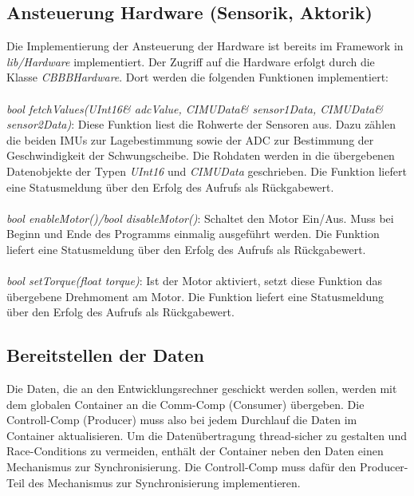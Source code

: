         \subsection{Ansteuerung Hardware (Sensorik, Aktorik)}
            Die Implementierung der Ansteuerung der Hardware ist bereits im Framework in \textit{lib/Hardware} implementiert. Der Zugriff auf die Hardware erfolgt durch die Klasse \textit{CBBBHardware}. Dort werden die folgenden Funktionen implementiert:\\
            \\
            \textit{bool fetchValues(UInt16\& adcValue, CIMUData\& sensor1Data, CIMUData\& sensor2Data)}: Diese Funktion liest die Rohwerte der Sensoren aus. Dazu zählen die beiden IMUs zur Lagebestimmung sowie der ADC zur Bestimmung der Geschwindigkeit der Schwungscheibe. Die Rohdaten werden in die übergebenen Datenobjekte der Typen \textit{UInt16} und \textit{CIMUData} geschrieben. Die Funktion liefert eine Statusmeldung über den Erfolg des Aufrufs als Rückgabewert.\\
            \\
            \textit{bool enableMotor()/bool disableMotor()}: Schaltet den Motor Ein/Aus. Muss bei Beginn und Ende des Programms einmalig ausgeführt werden. Die Funktion liefert eine Statusmeldung über den Erfolg des Aufrufs als Rückgabewert.\\
            \\
            \textit{bool setTorque(float torque)}: Ist der Motor aktiviert, setzt diese Funktion das übergebene Drehmoment am Motor. Die Funktion liefert eine Statusmeldung über den Erfolg des Aufrufs als Rückgabewert.
            
        \subsection{Bereitstellen der Daten}
            Die Daten, die an den Entwicklungsrechner geschickt werden sollen, werden mit dem globalen Container an die Comm-Comp (Consumer) übergeben. Die Controll-Comp (Producer) muss also bei jedem Durchlauf die Daten im Container aktualisieren. Um die Datenübertragung thread-sicher zu gestalten und Race-Conditions zu vermeiden, enthält der Container neben den Daten einen Mechanismus zur Synchronisierung. Die Controll-Comp muss dafür den Producer-Teil des Mechanismus zur Synchronisierung implementieren.

